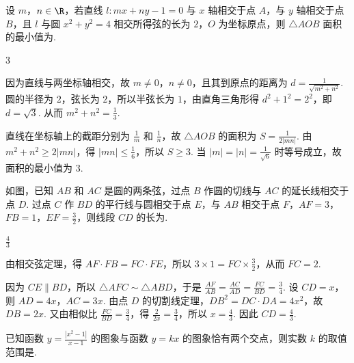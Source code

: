\begin{problem}
设 \(m\)，\(n \in \R\)，若直线 \(l: mx + ny - 1 = 0\) 与 \(x\) 轴相交于点 \(A\)，与 \(y\) 轴相交于点 \(B\)，且 \(l\) 与圆 \(x^2 + y^2 = 4\) 相交所得弦的长为 \(2\)，\(O\) 为坐标原点，则 \(\triangle AOB\) 面积的最小值为\fillinblank{}.
\end{problem}

\begin{answer}
3
\end{answer}

\begin{solution}
因为直线与两坐标轴相交，故 \(m\ne0\)，\(n\ne0\)，且其到原点的距离为 \(d=\frac{1}{\sqrt{m^2+n^2}}\). 圆的半径为 \(2\)，弦长为 \(2\)，所以半弦长为 \(1\)，由直角三角形得 \(d^2+1^2=2^2\)，即 \(d=\sqrt3\). 从而 \(m^2+n^2=\frac13\).

直线在坐标轴上的截距分别为 \(\frac1m\) 和 \(\frac1n\)，故 \(\triangle AOB\) 的面积为 \(S=\frac{1}{2\lvert mn\rvert}\). 由 \(m^2+n^2\geqslant2\lvert mn\rvert\)，得 \(\lvert mn\rvert\leqslant\frac16\)，所以 \(S\geqslant3\). 当 \(\lvert m\rvert=\lvert n\rvert=\frac{1}{\sqrt6}\) 时等号成立，故面积的最小值为 \(3\).
\end{solution}

\begin{problem}
如图，已知 \(AB\) 和 \(AC\) 是圆的两条弦，过点 \(B\) 作圆的切线与 \(AC\) 的延长线相交于点 \(D\). 过点 \(C\) 作 \(BD\) 的平行线与圆相交于点 \(E\)，与 \(AB\) 相交于点 \(F\)，\(AF = 3\)，\(FB = 1\)，\(EF = \frac{3}{2}\)，则线段 \(CD\) 的长为\fillinblank{}.
\end{problem}

\begin{answer}
\(\frac{4}{3}\)
\end{answer}

\begin{solution}
由相交弦定理，得 \(AF\cdot FB=FC\cdot FE\)，所以 \(3\times1=FC\times\frac32\)，从而 \(FC=2\).

因为 \(CE\parallel BD\)，所以 \(\triangle AFC\sim\triangle ABD\)，于是 \(\frac{AF}{AB}=\frac{AC}{AD}=\frac{FC}{BD}=\frac34\). 设 \(CD=x\)，则 \(AD=4x\)，\(AC=3x\). 由点 \(D\) 的切割线定理，\(DB^2=DC\cdot DA=4x^2\)，故 \(DB=2x\). 又由相似比 \(\frac{FC}{BD}=\frac34\)，得 \(\frac{2}{2x}=\frac34\)，所以 \(x=\frac43\). 因此 \(CD=\frac43\).
\end{solution}

\begin{problem}
已知函数 \( y = \frac{|x^2 - 1|}{x - 1} \) 的图象与函数 \( y = kx \) 的图象恰有两个交点，则实数 \( k \) 的取值范围是\fillinblank{}.
\end{problem}

